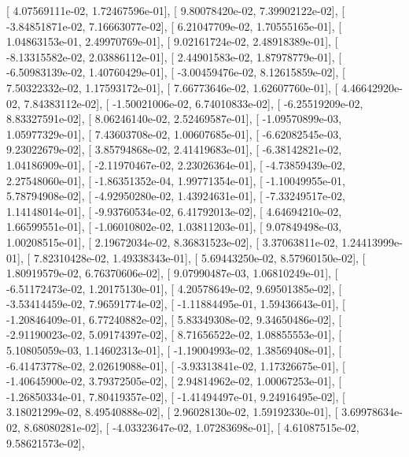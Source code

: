 \documentclass{article}
\begin{document}
       [  4.07569111e-02,   1.72467596e-01],
       [  9.80078420e-02,   7.39902122e-02],
       [ -3.84851871e-02,   7.16663077e-02],
       [  6.21047709e-02,   1.70555165e-01],
       [  1.04863153e-01,   2.49970769e-01],
       [  9.02161724e-02,   2.48918389e-01],
       [ -8.13315582e-02,   2.03886112e-01],
       [  2.44901583e-02,   1.87978779e-01],
       [ -6.50983139e-02,   1.40760429e-01],
       [ -3.00459476e-02,   8.12615859e-02],
       [  7.50322332e-02,   1.17593172e-01],
       [  7.66773646e-02,   1.62607760e-01],
       [  4.46642920e-02,   7.84383112e-02],
       [ -1.50021006e-02,   6.74010833e-02],
       [ -6.25519209e-02,   8.83327591e-02],
       [  8.06246140e-02,   2.52469587e-01],
       [ -1.09570899e-03,   1.05977329e-01],
       [  7.43603708e-02,   1.00607685e-01],
       [ -6.62082545e-03,   9.23022679e-02],
       [  3.85794868e-02,   2.41419683e-01],
       [ -6.38142821e-02,   1.04186909e-01],
       [ -2.11970467e-02,   2.23026364e-01],
       [ -4.73859439e-02,   2.27548060e-01],
       [ -1.86351352e-04,   1.99771354e-01],
       [ -1.10049955e-01,   5.78794908e-02],
       [ -4.92950280e-02,   1.43924631e-01],
       [ -7.33249517e-02,   1.14148014e-01],
       [ -9.93760534e-02,   6.41792013e-02],
       [  4.64694210e-02,   1.66599551e-01],
       [ -1.06010802e-02,   1.03811203e-01],
       [  9.07849498e-03,   1.00208515e-01],
       [  2.19672034e-02,   8.36831523e-02],
       [  3.37063811e-02,   1.24413999e-01],
       [  7.82310428e-02,   1.49338343e-01],
       [  5.69443250e-02,   8.57960150e-02],
       [  1.80919579e-02,   6.76370606e-02],
       [  9.07990487e-03,   1.06810249e-01],
       [ -6.51172473e-02,   1.20175130e-01],
       [  4.20578649e-02,   9.69501385e-02],
       [ -3.53414459e-02,   7.96591774e-02],
       [ -1.11884495e-01,   1.59436643e-01],
       [ -1.20846409e-01,   6.77240882e-02],
       [  5.83349308e-02,   9.34650486e-02],
       [ -2.91190023e-02,   5.09174397e-02],
       [  8.71656522e-02,   1.08855553e-01],
       [  5.10805059e-03,   1.14602313e-01],
       [ -1.19004993e-02,   1.38569408e-01],
       [ -6.41473778e-02,   2.02619088e-01],
       [ -3.93313841e-02,   1.17326675e-01],
       [ -1.40645900e-02,   3.79372505e-02],
       [  2.94814962e-02,   1.00067253e-01],
       [ -1.26850334e-01,   7.80419357e-02],
       [ -1.41494497e-01,   9.24916495e-02],
       [  3.18021299e-02,   8.49540888e-02],
       [  2.96028130e-02,   1.59192330e-01],
       [  3.69978634e-02,   8.68080281e-02],
       [ -4.03323647e-02,   1.07283698e-01],
       [  4.61087515e-02,   9.58621573e-02],
\end{document}
